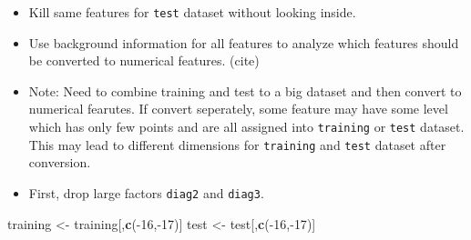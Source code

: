 \documentclass[]{article}
\newenvironment{Shaded}{\begin{snugshade}}{\end{snugshade}}
\newcommand{\KeywordTok}[1]{\textcolor[rgb]{0.13,0.29,0.53}{\textbf{{#1}}}}
\newcommand{\DataTypeTok}[1]{\textcolor[rgb]{0.13,0.29,0.53}{{#1}}}
\newcommand{\DecValTok}[1]{\textcolor[rgb]{0.00,0.00,0.81}{{#1}}}
\newcommand{\StringTok}[1]{\textcolor[rgb]{0.31,0.60,0.02}{{#1}}}
\newcommand{\OtherTok}[1]{\textcolor[rgb]{0.56,0.35,0.01}{{#1}}}
\newcommand{\NormalTok}[1]{{#1}}
\begin{document}
\begin{Shaded}
\end{Shaded}

\begin{itemize}
\itemsep1pt\parskip0pt
\item
  Kill same features for \texttt{test} dataset without looking inside.
\end{itemize}

\begin{Shaded}
\end{Shaded}

\begin{itemize}
\itemsep1pt\parskip0pt
\item
  Use background information for all features to analyze which features
  should be converted to numerical features. (cite)
\item
  Note: Need to combine training and test to a big dataset and then
  convert to numerical fearutes. If convert seperately, some feature may
  have some level which has only few points and are all assigned into
  \texttt{training} or \texttt{test} dataset. This may lead to different
  dimensions for \texttt{training} and \texttt{test} dataset after
  conversion.
\item
  First, drop large factors \texttt{diag2} and \texttt{diag3}.
\end{itemize}

\begin{Shaded}
\begin{Highlighting}[]
\NormalTok{training <-}\StringTok{ }\NormalTok{training[,}\KeywordTok{c}\NormalTok{(-}\DecValTok{16}\NormalTok{,-}\DecValTok{17}\NormalTok{)]}
\NormalTok{test <-}\StringTok{ }\NormalTok{test[,}\KeywordTok{c}\NormalTok{(-}\DecValTok{16}\NormalTok{,-}\DecValTok{17}\NormalTok{)]}
\end{Highlighting}
\end{Shaded}
\end{document}
